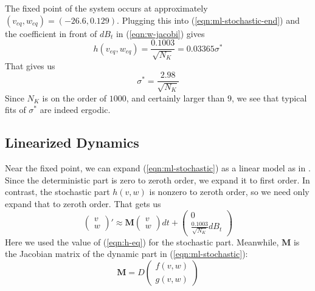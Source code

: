 \documentclass[letterpaper,12pt]{article}
\numberwithin{table}{section}
\numberwithin{figure}{section}
\numberwithin{equation}{section}
\newcommand*{\qvec}[2]{\begin{pmatrix} #1 \\ #2 \end{pmatrix}}
\begin{document}
\begin{flushleft}
    The fixed point of the system occurs at approximately $(v_{eq}, w_{eq}) = (-26.6, 0.129)$. Plugging this into (\ref{eqn:ml-stochastic-end}) and the coefficient in front of $dB_t$ in (\ref{eqn:w-jacobi}) gives
    \begin{equation}
        \label{eqn:h-eq}
        h(v_{eq}, w_{eq}) = \frac{0.1003}{\sqrt{N_K}} = 0.03365\sigma^*
    \end{equation}
    That gives us
    \begin{equation}
        \sigma^* = \frac{2.98}{\sqrt{N_K}}
    \end{equation}
    Since $N_K$ is on the order of $1000$, and certainly larger than $9$, we see that typical fits of $\sigma^*$ are indeed ergodic.

    \subsection{Linearized Dynamics}
    
    Near the fixed point, we can expand (\ref{eqn:ml-stochastic}) as a linear model as in \cite{dg}. Since the deterministic part is zero to zeroth order, we expand it to first order. In contrast, the stochastic part $h(v, w)$ is nonzero to zeroth order, so we need only expand that to zeroth order. That gets us
    \begin{equation}
        \label{eqn:mll}
        \qvec{v}{w}' \approx \mathbf{M} \qvec{v}{w} dt + \qvec{0}{\frac{0.1003}{\sqrt{N_K}} dB_t}
    \end{equation}
    Here we used the value of (\ref{eqn:h-eq}) for the stochastic part. Meanwhile, $\mathbf{M}$ is the Jacobian matrix of the dynamic part in (\ref{eqn:ml-stochastic}):
    \begin{equation}
        \mathbf{M} = D\qvec{f(v, w)}{g(v, w)}
    \end{equation}


\end{flushleft}
\end{document}
